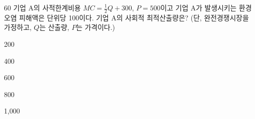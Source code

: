 \begin{question}{60}
기업 A의 사적한계비용 $MC = \frac{1}{2}Q + 300$, $P = 500$이고 기업 A가 발생시키는 환경오염 피해액은 단위당 100이다. 기업 A의 사회적 최적산출량은? (단, 완전경쟁시장을 가정하고, $Q$는 산출량, $P$는 가격이다.)
\begin{choices}
  \item 200
  \item 400
  \item 600
  \item 800
  \item 1,000
\end{choices}
\end{question}
